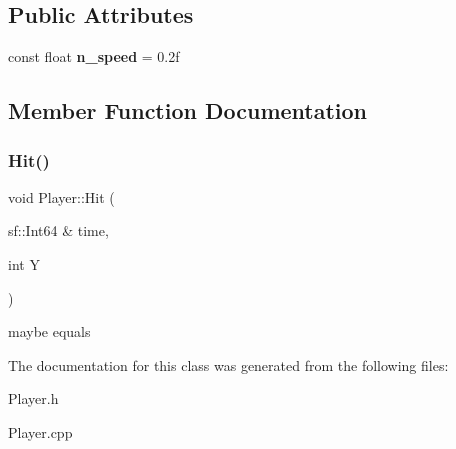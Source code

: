 \subsection*{Public Attributes}
\begin{DoxyCompactItemize}
\item 
\mbox{\label{class_player_aa71a31c2f38eae8aa3d5c6c764e1cfd1}} 
const float {\bfseries n\+\_\+speed} = 0.\+2f
\end{DoxyCompactItemize}


\subsection{Member Function Documentation}
\mbox{\label{class_player_abb881e3cbced276d41fb3d4a3ba4b329}} 
\subsubsection{\texorpdfstring{Hit()}{Hit()}}
{\footnotesize\ttfamily void Player\+::\+Hit (\begin{DoxyParamCaption}\item[{sf\+::\+Int64 \&}]{time,  }\item[{int}]{Y }\end{DoxyParamCaption})}

maybe equals 

The documentation for this class was generated from the following files\+:\begin{DoxyCompactItemize}
\item 
Player.\+h\item 
Player.\+cpp\end{DoxyCompactItemize}

